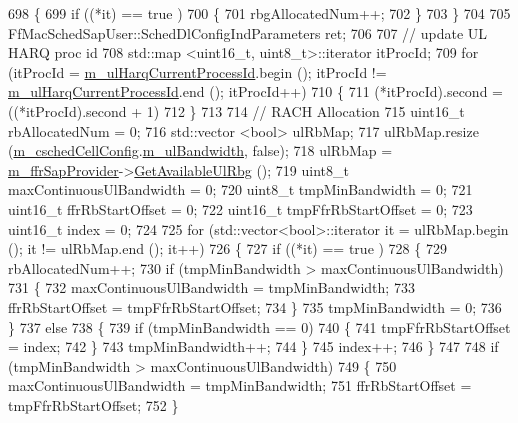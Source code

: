 \begin{DoxyCode}
698     \{
699       \textcolor{keywordflow}{if} ((*it) == true )
700         \{
701           rbgAllocatedNum++;
702         \}
703     \}
704 
705   FfMacSchedSapUser::SchedDlConfigIndParameters ret;
706 
707   \textcolor{comment}{//   update UL HARQ proc id}
708   std::map <uint16\_t, uint8\_t>::iterator itProcId;
709   \textcolor{keywordflow}{for} (itProcId = \hyperlink{classns3_1_1PssFfMacScheduler_a9e2a7c8f3e5e48aa429a5a06f4f70a72}{m\_ulHarqCurrentProcessId}.begin (); itProcId != 
      \hyperlink{classns3_1_1PssFfMacScheduler_a9e2a7c8f3e5e48aa429a5a06f4f70a72}{m\_ulHarqCurrentProcessId}.end (); itProcId++)
710     \{
711       (*itProcId).second = ((*itProcId).second + 1) %
712     \}
713 
714   \textcolor{comment}{// RACH Allocation}
715   uint16\_t rbAllocatedNum = 0;
716   std::vector <bool> ulRbMap;
717   ulRbMap.resize (\hyperlink{classns3_1_1PssFfMacScheduler_a6808e2b2024ed0ced82f80bfe6f0801f}{m\_cschedCellConfig}.\hyperlink{structns3_1_1FfMacCschedSapProvider_1_1CschedCellConfigReqParameters_a5ab5b102878e6e7e7727a14af4a64d2f}{m\_ulBandwidth}, \textcolor{keyword}{false});
718   ulRbMap = \hyperlink{classns3_1_1PssFfMacScheduler_a8b7889293dd002f806e2d6afd9c50aed}{m\_ffrSapProvider}->\hyperlink{classns3_1_1LteFfrSapProvider_aafd23b22a27ec83e03d54795c122d175}{GetAvailableUlRbg} ();
719   uint8\_t maxContinuousUlBandwidth = 0;
720   uint8\_t tmpMinBandwidth = 0;
721   uint16\_t ffrRbStartOffset = 0;
722   uint16\_t tmpFfrRbStartOffset = 0;
723   uint16\_t index = 0;
724 
725   \textcolor{keywordflow}{for} (std::vector<bool>::iterator it = ulRbMap.begin (); it != ulRbMap.end (); it++)
726     \{
727       \textcolor{keywordflow}{if} ((*it) == true )
728         \{
729           rbAllocatedNum++;
730           \textcolor{keywordflow}{if} (tmpMinBandwidth > maxContinuousUlBandwidth)
731             \{
732               maxContinuousUlBandwidth = tmpMinBandwidth;
733               ffrRbStartOffset = tmpFfrRbStartOffset;
734             \}
735           tmpMinBandwidth = 0;
736         \}
737       \textcolor{keywordflow}{else}
738         \{
739           \textcolor{keywordflow}{if} (tmpMinBandwidth == 0)
740             \{
741               tmpFfrRbStartOffset = index;
742             \}
743           tmpMinBandwidth++;
744         \}
745       index++;
746     \}
747 
748   \textcolor{keywordflow}{if} (tmpMinBandwidth > maxContinuousUlBandwidth)
749     \{
750       maxContinuousUlBandwidth = tmpMinBandwidth;
751       ffrRbStartOffset = tmpFfrRbStartOffset;
752     \}

\end{DoxyCode}
